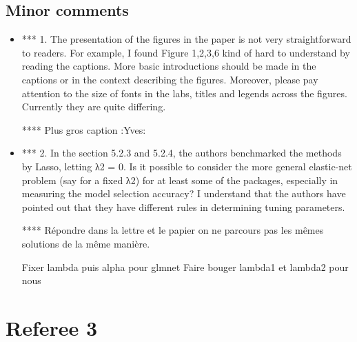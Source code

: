 \documentclass[a4paper,11pt]{texMemo}
\begin{document}
\subsection*{Minor comments}

\begin{itemize}
\item
  *** 1. The presentation of the figures in the paper is not very straightforward to readers. For
example, I found Figure 1,2,3,6 kind of hard to understand by reading the captions.
More basic introductions should be made in the captions or in the context describing
the figures. Moreover, please pay attention to the size of fonts in the labs, titles and
legends across the figures. Currently they are quite differing.


**** Plus gros caption :Yves:

\item 
*** 2. In the section 5.2.3 and 5.2.4, the authors benchmarked the methods by Lasso, letting
λ2 = 0. Is it possible to consider the more general elastic-net problem (say for a fixed
λ2) for at least some of the packages, especially in measuring the model selection
accuracy? I understand that the authors have pointed out that they have different
rules in determining tuning parameters.

**** Répondre dans la lettre et le papier on ne parcours pas les mêmes solutions de la même manière.

Fixer lambda puis alpha pour glmnet
Faire bouger lambda1 et lambda2 pour nous

\end{itemize}


\section*{Referee 3}

\end{document}
